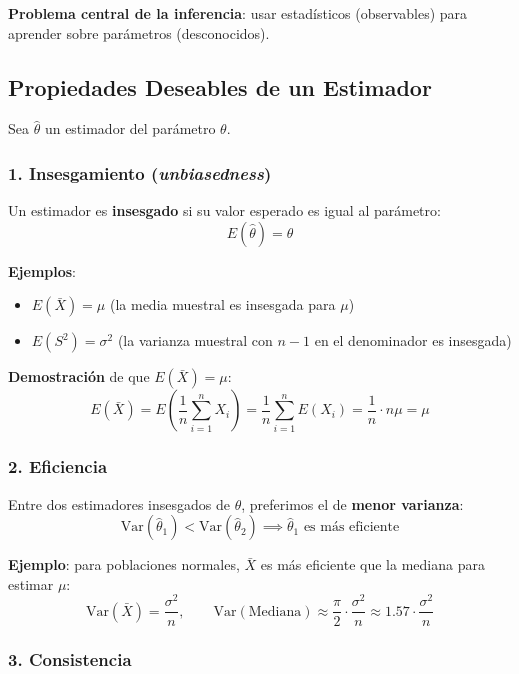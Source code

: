 \documentclass[11pt, a4paper]{article}
\begin{document}
\textbf{Problema central de la inferencia}: usar estad\'isticos (observables) para aprender sobre par\'ametros (desconocidos).

\subsection{Propiedades Deseables de un Estimador}

Sea $\hat{\theta}$ un estimador del par\'ametro $\theta$.

\subsubsection{1. Insesgamiento (\textit{unbiasedness})}

Un estimador es \textbf{insesgado} si su valor esperado es igual al par\'ametro:
\[
E(\hat{\theta}) = \theta
\]

\textbf{Ejemplos}:
\begin{itemize}
  \item $E(\bar{X}) = \mu$ \quad (la media muestral es insesgada para $\mu$)
  \item $E(S^2) = \sigma^2$ \quad (la varianza muestral con $n-1$ en el denominador es insesgada)
\end{itemize}

\textbf{Demostraci\'on} de que $E(\bar{X}) = \mu$:
\[
E(\bar{X}) = E\!\left(\frac{1}{n}\sum_{i=1}^{n} X_i\right)
= \frac{1}{n}\sum_{i=1}^{n} E(X_i)
= \frac{1}{n} \cdot n\mu = \mu
\]

\subsubsection{2. Eficiencia}

Entre dos estimadores insesgados de $\theta$, preferimos el de \textbf{menor varianza}:
\[
\text{Var}(\hat{\theta}_1) < \text{Var}(\hat{\theta}_2) \implies \hat{\theta}_1 \text{ es m\'as eficiente}
\]

\textbf{Ejemplo}: para poblaciones normales, $\bar{X}$ es m\'as eficiente que la mediana para estimar $\mu$:
\[
\text{Var}(\bar{X}) = \frac{\sigma^2}{n}, \qquad
\text{Var}(\text{Mediana}) \approx \frac{\pi}{2} \cdot \frac{\sigma^2}{n} \approx 1.57 \cdot \frac{\sigma^2}{n}
\]

\subsubsection{3. Consistencia}
\end{document}
